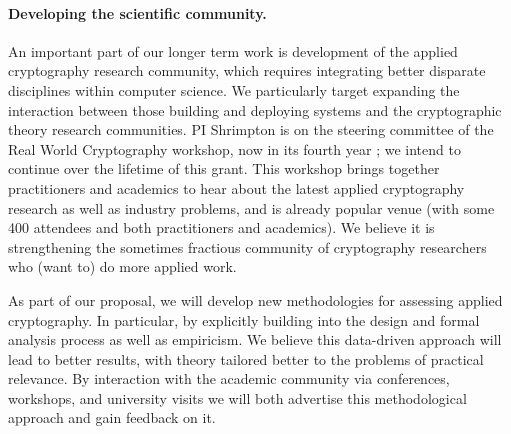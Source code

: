\paragraph{Developing the scientific community.} An important part of our longer
term work is development of the applied cryptography research community, which
requires integrating better disparate disciplines within computer science. We
particularly target expanding the interaction between those building and
deploying systems and the cryptographic theory research communities.  PI
Shrimpton is on the steering committee of the Real World
Cryptography workshop, now in its fourth year ; we intend to continue
over the lifetime of this grant.  This workshop brings
together practitioners and academics to hear about the latest applied
cryptography research as well as industry problems, and is already
popular venue (with some 400 attendees and both practitioners and
academics). We believe it is strengthening the sometimes fractious community of
cryptography researchers who (want to) do more applied work. 

As part of our proposal, we will develop new methodologies for assessing applied
cryptography. In particular, by explicitly building into the design and formal
analysis process as well as empiricism. We believe this data-driven approach
will lead to better results, with theory tailored better to  the problems of
practical relevance. By interaction with the academic community via conferences,
workshops, and university visits we will both advertise this methodological
approach and gain feedback on it. 




